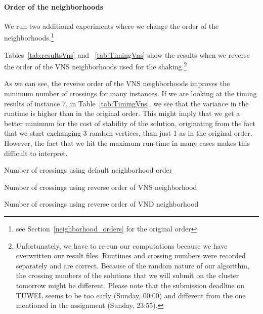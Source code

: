 \documentclass{scrartcl}
\begin{document}
\paragraph{Order of the neighborhoods}
We run two additional experiments where we change the order of the
neighborhoods.\footnote{see Section~\ref{neighborhood_orders} for the
  original order}

Tables~\ref{tab:resultsVns} and ~\ref{tab:TimingVns} show the results
when we reverse the order of the VNS neighborhoods used for the
shaking.\footnote{Unfortunately, we have to re-run our computations
  because we have overwritten our result files. Runtimes and crossing
  numbers were recorded separately and are correct. Because of the
  random nature of our algorithm, the crossing numbers of the
  solutions that we will submit on the cluster tomorrow might be
  different. Please note that the submission deadline on TUWEL seems
  to be too early (Sunday, 00:00) and different from the one mentioned
  in the assignment (Sunday, 23:55).}

As we can see, the reverse order of the VNS neighborhoods improves the
minimum number of crossings for many instances. If we are looking at
the timing results of instance 7, in Table~\ref{tab:TimingVns}, we see
that the variance in the runtime is higher than in the original order.
This might imply that we get a better minimum for the cost of
stability of the solution, originating from the fact that we start
exchanging 3 random vertices, than just 1 as in the original
order. However, the fact that we hit the maximum run-time in many
cases makes this difficult to interpret.


\begin{table}[!H]
  \centering
  \scriptsize
  
\caption{Number of crossings using default neighborhood order}
\label{tab:resultsOverall}
\end{table}

\begin{table}[!H]
  \centering
  \scriptsize
  
\caption{Number of crossings using reverse order of VNS neighborhood}
\label{tab:resultsVns}
\end{table}

\begin{table}[!H]
  \centering
  \scriptsize
  
\caption{Number of crossings using reverse order of VND neighborhood}
\label{tab:resultsVnd}
\end{table}
\end{document}
